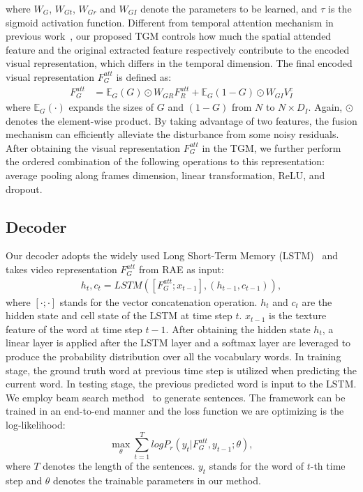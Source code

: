 \documentclass[a4paper,conference]{IEEEtran}
\begin{document}
where $W_G$, $ W_{Gt}$, $ W_{Gr}$ and $W_{GI}$ denote the parameters to be learned,
and $\tau$ is the sigmoid activation function. Different from temporal attention mechanism in previous work~\cite{tu2017video, song2017hierarchical}, our proposed TGM controls how much the spatial attended feature and the original extracted feature respectively contribute to the encoded visual representation, which differs in the temporal dimension. The final encoded visual representation $F_G^{att}$ is defined as:
\begin{equation}
\begin{aligned}
F_{G}^{att} &= \mathbb{E}_{G}(G) \odot W_{GR}F_{R}^{att} + \mathbb{E}_{G}(1-G) \odot W_{GI}V_I^c
\end{aligned}
\end{equation}
where $\mathbb{E}_{G}(\cdot)$ expands the sizes of $G$ and $(1-G)$ from $N$ to $N \times D_I$. Again, $\odot$ denotes the element-wise product. By taking advantage of two features, the fusion mechanism can efficiently alleviate the disturbance from some noisy residuals. 
After obtaining the visual representation $F_{G}^{att}$ in the TGM, we further perform the ordered combination of the following operations to this representation: average pooling along frames dimension, linear transformation, ReLU, and dropout.

\subsection{Decoder}
\label{section:Decoder}
Our decoder 
adopts the widely used Long Short-Term Memory (LSTM)~\cite{hochreiter1997long} and takes video representation $F_G^{att}$ from RAE as input:
\begin{equation}
\begin{aligned}
h_t, c_t = LSTM([F_G^{att};x_{t-1}], (h_{t-1}, c_{t-1})), 
\end{aligned}
\end{equation}
 where $[\cdot;\cdot]$ stands for the vector concatenation operation. $h_t$ and $c_t$ are the hidden state and cell state of the LSTM at time step $t$. $x_{t-1}$ is the texture feature of the word at time step $t-1$. After obtaining the hidden state $h_t$, a linear layer is applied after the LSTM layer and a softmax layer are leveraged to produce the probability distribution over all the vocabulary words. In training stage, the ground truth word at previous time step is utilized when predicting the current word. In testing stage, the previous predicted word is input to the LSTM. We employ beam search method~\cite{freitag2017beam} to generate sentences. The framework can be trained in an end-to-end manner and the loss function we are optimizing is the log-likelihood:
\begin{equation}
   \mathop{max}\limits_{\theta}\sum_{t=1}^T log P_r(y_t|F_G^{att}, y_{t-1};\theta),
\end{equation}
where $T$ denotes the length of the sentences. $y_t$ stands for the word of $t$-th time step and $\theta$ denotes the trainable parameters in our method.
\end{document}
